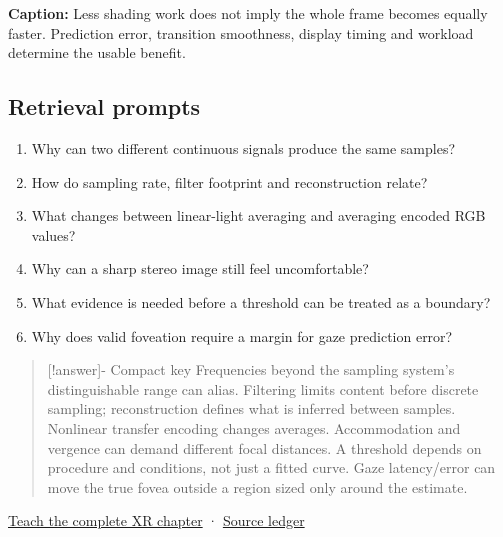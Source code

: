 \textbf{Caption:} Less shading work does not imply the whole frame becomes equally faster. Prediction error, transition smoothness, display timing and workload determine the usable benefit.

\subsection{Retrieval prompts}\label{appendix-73c6b8ed5a87-retrieval-prompts}

\hypertarget{appendix-73c6b8ed5a87-retrieval-prompts}{}

\begin{enumerate}
\def\labelenumi{\arabic{enumi}.}
\tightlist
\item
  Why can two different continuous signals produce the same samples?
\item
  How do sampling rate, filter footprint and reconstruction relate?
\item
  What changes between linear-light averaging and averaging encoded RGB values?
\item
  Why can a sharp stereo image still feel uncomfortable?
\item
  What evidence is needed before a threshold can be treated as a boundary?
\item
  Why does valid foveation require a margin for gaze prediction error?
\end{enumerate}

\begin{quote}
{[}!answer{]}- Compact key Frequencies beyond the sampling system's distinguishable range can alias. Filtering limits content before discrete sampling; reconstruction defines what is inferred between samples. Nonlinear transfer encoding changes averages. Accommodation and vergence can demand different focal distances. A threshold depends on procedure and conditions, not just a fitted curve. Gaze latency/error can move the true fovea outside a region sized only around the estimate.
\end{quote}

\hyperref[04-visual-computing-ii-ch042-sampling-is-a-question-of-what-remains-distinguishable]{Teach the complete XR chapter} · \hyperref[appendix-fd090d982a15-xr01---independent-seeing-and-representation-source]{Source ledger}

